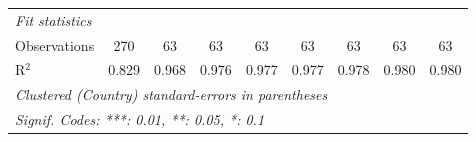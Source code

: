 \begin{table}[htbp]
\begin{tabular}{lcccccccc}
      \midrule \emph{Fit statistics}\\
      Observations                                                                       & 270     & 63      & 63            & 63            & 63             & 63             & 63            & 63\\  
      R$^2$                                                                              & 0.829   & 0.968   & 0.976         & 0.977         & 0.977          & 0.978          & 0.980         & 0.980\\  
      \midrule
      \multicolumn{9}{l}{\emph{Clustered (Country) standard-errors in parentheses}}\\
      \multicolumn{9}{l}{\emph{Signif. Codes: ***: 0.01, **: 0.05, *: 0.1}}\\
   \end{tabular}
\end{table}


